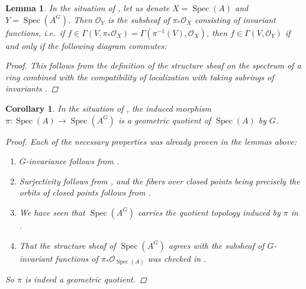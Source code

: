\documentclass[12pt,a4paper]{amsart}
\theoremstyle{plain}
\newtheorem{lm}[thm]{Lemma}
\newtheorem{cor}[thm]{Corollary}
\theoremstyle{definition}
\theoremstyle{remark}
\begin{document}
\begin{lm}\label{lm:invariantslocalization}
  In the situation of , let us denote $X = \operatorname{Spec}(A)$ and $Y = \operatorname{Spec}(A^{G})$.
  Then $\mathscr{O}_{Y}$ is the subsheaf of $\pi_{*}\mathscr{O}_{X}$ consisting of invariant functions, i.e.~if $f \in \Gamma(V,\pi_{*}\mathscr{O}_{X}) = \Gamma(\pi^{-1}(V),\mathscr{O}_{X})$, then $f \in \Gamma(V, \mathscr{O}_{Y})$ if and only if the following diagram commutes:
  
  \begin{center}
  \end{center}

  \begin{proof}
    This follows from the definition of the structure sheaf on the spectrum of a ring combined with the compatibility of localization with taking subrings of invariants \cite[Exercise 5.12]{am69}.
  \end{proof}

\end{lm}

\begin{cor}\label{cor:affinequotient}
  In the situation of , the induced morphism $\pi \colon \operatorname{Spec}(A) \to \operatorname{Spec}(A^{G})$ is a geometric quotient of $\operatorname{Spec}(A)$ by $G$.

  \begin{proof}
    Each of the necessary properties was already proven in the lemmas above:
    \begin{enumerate}
      \item $G$-invariance follows from .
      \item Surjectivity follows from , and the fibers over closed points being precisely the orbits of closed points follows from .
      \item We have seen that $\operatorname{Spec}(A^{G})$ carries the quotient topology induced by $\pi$ in .
      \item That the structure sheaf of $\operatorname{Spec}(A^{G})$ agrees with the subsheaf of $G$-invariant functions of $\pi_{*}\mathscr{O}_{\operatorname{Spec}(A)}$ was checked in .
    \end{enumerate}
    So $\pi$ is indeed a geometric quotient.  
  \end{proof}

\end{cor}
\end{document}
